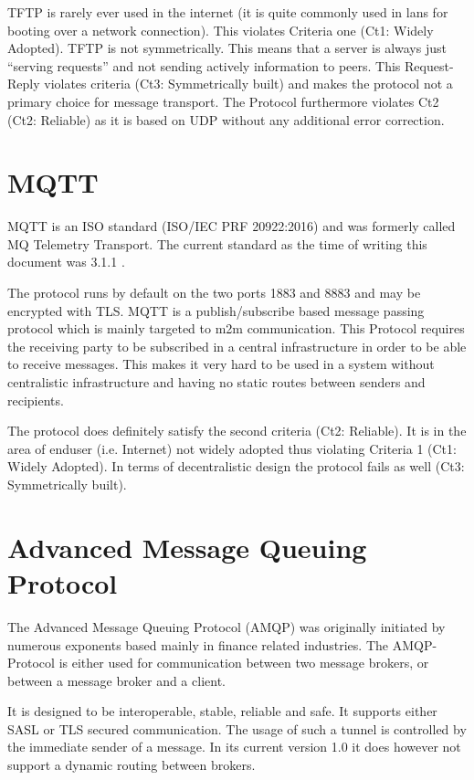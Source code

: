 \documentclass[a4paper,appendixprefix,pdfusetitle,twocolumn,fontsize=8pt,attachdocs,draft,status=draft]{scrbook}
\begin{document}
TFTP is rarely ever used in the internet (it is quite commonly used in lans for booting over a network connection). This violates Criteria one (Ct1: Widely Adopted). TFTP is not symmetrically. This means that a server is always just ``serving requests'' and not sending actively information to peers. This Request-Reply violates criteria (Ct3: Symmetrically built) and makes the protocol not a primary choice for  message transport. The Protocol furthermore violates Ct2 (Ct2: Reliable) as it is based on UDP without any additional error correction.

\section{MQTT}
MQTT is an ISO standard (ISO/IEC PRF 20922:2016) and was formerly called MQ Telemetry Transport. The current standard as the time of writing this document was 3.1.1 \cite{mqtt}. 

The protocol runs by default on the two ports 1883 and 8883 and may be encrypted with TLS. MQTT is a publish/subscribe based message passing protocol which is mainly targeted to m2m communication. This Protocol requires the receiving party to be subscribed in a central infrastructure in order to be able to receive messages. This makes it very hard to be used in a system without centralistic infrastructure and having no static routes between senders and recipients.

The protocol does definitely satisfy the second criteria (Ct2: Reliable). It is in the area of enduser (i.e. Internet) not widely adopted thus violating Criteria 1 (Ct1: Widely Adopted). In terms of decentralistic design the protocol fails as well (Ct3: Symmetrically built).

\section{Advanced Message Queuing Protocol}
The Advanced Message Queuing Protocol (AMQP) was originally initiated by numerous exponents based mainly in finance related industries. The AMQP-Protocol is either used for communication between two message brokers, or between a message broker and a client\cite{amqp}.

It is designed to be interoperable, stable, reliable and safe. It supports either SASL or TLS secured communication. The usage of such a tunnel is controlled by the immediate sender of a message. In its current version 1.0 it does however not support a dynamic routing between brokers\cite{amqp}.
\end{document}
